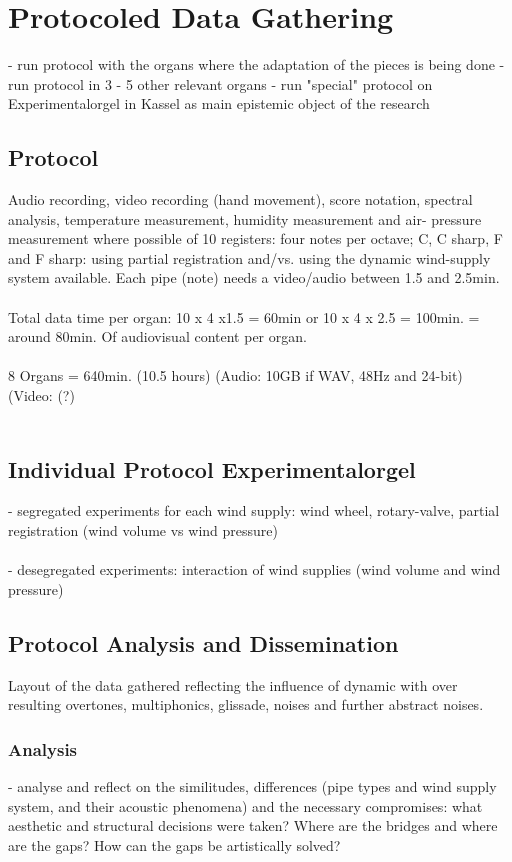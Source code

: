 \section{Protocoled Data Gathering}

- run protocol with the organs where the adaptation of the pieces is being done
- run protocol in 3 - 5 other relevant organs
- run "special" protocol on Experimentalorgel in Kassel as main epistemic object of the research 

\subsection{Protocol} 

Audio recording, video recording (hand movement), score notation, spectral analysis, temperature measurement, humidity measurement and air- pressure measurement where possible  of 10 registers: four notes per octave; C, C sharp, F and F sharp: using partial registration and/vs. using the dynamic wind-supply system available.
Each pipe (note) needs a video/audio between 1.5 and 2.5min. \\
\\
Total data time per organ: 10 x 4 x1.5 = 60min or 10 x 4 x 2.5 = 100min. = around 80min. Of audiovisual content per organ. \\
\\
8 Organs = 640min. (10.5 hours) (Audio: 10GB if WAV, 48Hz and 24-bit) (Video: (?)\\
\\
\subsection{Individual Protocol Experimentalorgel}

- segregated experiments for each wind supply: wind wheel, rotary-valve, partial registration (wind volume vs wind pressure)\\
\\
- desegregated experiments: interaction of wind supplies (wind volume and wind pressure)

\subsection{Protocol Analysis and Dissemination}

Layout of the data gathered reflecting the influence of dynamic with over resulting overtones, multiphonics, glissade, noises and further  abstract noises. 

\subsubsection{Analysis}

- analyse and reflect on the similitudes, differences (pipe types and wind supply system, and their acoustic phenomena) and the necessary compromises: what aesthetic and structural decisions were taken? Where are the bridges and where are the gaps? How can the gaps be artistically solved?\\
\\



